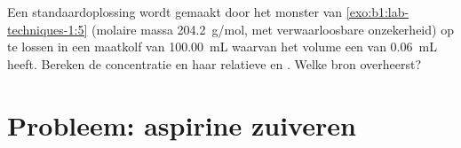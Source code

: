 \begin{exercise}[$\star\star\star$]\label{exo:b1:lab-techniques-1:12}
Een standaardoplossing wordt gemaakt door het monster van
\cref{exo:b1:lab-techniques-1:5} (molaire massa \qty{204.2}{g/mol}, met
verwaarloosbare onzekerheid) op te lossen in een maatkolf van
\qty{100.00}{mL} waarvan het volume een  van
\qty{0.06}{mL} heeft. Bereken de concentratie en haar relatieve en
. Welke bron overheerst?
\end{exercise}

\section{Probleem: aspirine zuiveren}


